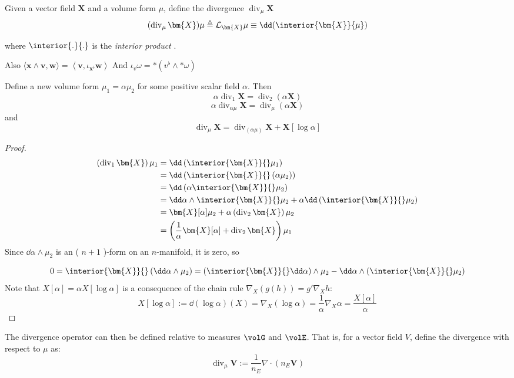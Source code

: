 


\begin{definition}[Divergence]
\citep[pp]{marsden1994mathematical} 
Given a vector field \(\bm{X}\) and a volume form \(\mu\), define the divergence \(\operatorname{div}_{\mu}\bm{X}\) 
\[
(\operatorname{div}_{\mu}\bm{X})\mu \triangleq \mathcal{L}_{\bm{X}}\mu
\equiv \dd (\interior{\bm{X}}{\mu})
\]
\end{definition}

where \(\interior{.}{.}\) is the \emph{interior product} . 

Also 
$\langle\mathbf{x} \wedge \mathbf{v}, \mathbf{w}\rangle=\left\langle\mathbf{v}, \iota_{\mathbf{x}^{\flat}} \mathbf{w}\right\rangle$
And
$\iota_v \omega=*\left(v^{\flat} \wedge * \omega\right)$

\begin{proposition}
Define a new volume form \(\mu_1 = \alpha \mu_2\) for some positive scalar field \(\alpha\). 
Then
\[
\alpha \operatorname{div}_1 \bm{X} = \operatorname{div}_2(\alpha \bm{X})
\]
\[
\alpha \operatorname{div}_{\alpha \mu} \bm{X} = \operatorname{div}_{\mu}(\alpha \bm{X})
\]
and
\[
\operatorname{div}_{\mu} \bm{X} = \operatorname{div}_{(\alpha \mu)} \bm{X}+\bm{X}[\log \alpha]
\]
\end{proposition}
\begin{proof}
$$
\begin{aligned}
\left(\operatorname{div}_1 \bm{X}\right) \mu_1 & =\dd \left(\interior{\bm{X}}{} \mu_1\right) \\
& =\dd \left(\interior{\bm{X}}{}\left(\alpha \mu_2\right)\right) \\
& =\dd \left(\alpha \interior{\bm{X}}{} \mu_2\right) \\
& =\dd \alpha \wedge \interior{\bm{X}}{} \mu_2 + \alpha \dd\left(\interior{\bm{X}}{} \mu_2\right) \\
& = \bm{X}[\alpha] \mu_2+\alpha\left(\operatorname{div}_2 \bm{X}\right) \mu_2 \\
& =\left(\frac{1}{\alpha}\bm{X}[\alpha]+\operatorname{div}_2 \bm{X}\right) \mu_1
\end{aligned}
$$
Since $\dd \alpha \wedge \mu_2$ is an ( $n+1$ )-form on an $n$-manifold, it is zero, so

$$
0=\interior{\bm{X}}{}\left(\dd \alpha \wedge \mu_2\right)=\left(\interior{\bm{X}}{} \dd \alpha\right) \wedge \mu_2- \dd \alpha \wedge\left(\interior{\bm{X}}{} \mu_2\right)
$$
Note that \(X[\alpha] = \alpha X[\log \alpha]\) is a consequence of the chain rule \(\nabla_X(g(h)) = g' \nabla_X h\):
\[
X[\log \alpha]
:=\dd (\log \alpha)(X)
= \nabla_X(\log \alpha) 
=\frac{1}{\alpha} \nabla_X \alpha
=\frac{X[\alpha]}{\alpha}
\]

\end{proof}
\iffalse
The divergence operator can then be defined relative to measures \(\volG\) and \(\volE\). 
That is, for a vector field $V$, define the divergence with respect to $\mu$ as:
$$
\operatorname{div}_\mu \boldsymbol{V}:=\frac{1}{n_E} \nabla \cdot\left(n_E \boldsymbol{V}\right)
$$


